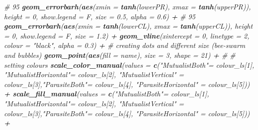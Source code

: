 \documentclass[
]{article}
\newenvironment{Shaded}{\begin{snugshade}}{\end{snugshade}}
\newcommand{\CommentTok}[1]{\textcolor[rgb]{0.56,0.35,0.01}{\textit{#1}}}
\newcommand{\DataTypeTok}[1]{\textcolor[rgb]{0.13,0.29,0.53}{#1}}
\newcommand{\DecValTok}[1]{\textcolor[rgb]{0.00,0.00,0.81}{#1}}
\newcommand{\FloatTok}[1]{\textcolor[rgb]{0.00,0.00,0.81}{#1}}
\newcommand{\KeywordTok}[1]{\textcolor[rgb]{0.13,0.29,0.53}{\textbf{#1}}}
\newcommand{\NormalTok}[1]{#1}
\newcommand{\OperatorTok}[1]{\textcolor[rgb]{0.81,0.36,0.00}{\textbf{#1}}}
\newcommand{\StringTok}[1]{\textcolor[rgb]{0.31,0.60,0.02}{#1}}
\begin{document}
\begin{Shaded}
\begin{Highlighting}[]
{{{\StringTok{  }\CommentTok{# 95 %
\StringTok{  }\KeywordTok{geom_errorbarh}\NormalTok{(}\KeywordTok{aes}\NormalTok{(}\DataTypeTok{xmin =} \KeywordTok{tanh}\NormalTok{(lowerPR), }\DataTypeTok{xmax =} \KeywordTok{tanh}\NormalTok{(upperPR)),  }\DataTypeTok{height =} \DecValTok{0}\NormalTok{, }\DataTypeTok{show.legend =}\NormalTok{ F, }\DataTypeTok{size =} \FloatTok{0.5}\NormalTok{, }\DataTypeTok{alpha =} \FloatTok{0.6}\NormalTok{) }\OperatorTok{+}
\StringTok{  }\CommentTok{# 95 %
\StringTok{  }\KeywordTok{geom_errorbarh}\NormalTok{(}\KeywordTok{aes}\NormalTok{(}\DataTypeTok{xmin =} \KeywordTok{tanh}\NormalTok{(lowerCL), }\DataTypeTok{xmax =} \KeywordTok{tanh}\NormalTok{(upperCL)),  }\DataTypeTok{height =} \DecValTok{0}\NormalTok{, }\DataTypeTok{show.legend =}\NormalTok{ F, }\DataTypeTok{size =} \FloatTok{1.2}\NormalTok{) }\OperatorTok{+}
\StringTok{  }\KeywordTok{geom_vline}\NormalTok{(}\DataTypeTok{xintercept =} \DecValTok{0}\NormalTok{, }\DataTypeTok{linetype =} \DecValTok{2}\NormalTok{, }\DataTypeTok{colour =} \StringTok{"black"}\NormalTok{, }\DataTypeTok{alpha =} \FloatTok{0.3}\NormalTok{) }\OperatorTok{+}
\StringTok{  }\CommentTok{# creating dots and different size (bee-swarm and bubbles)}
\StringTok{  }\KeywordTok{geom_point}\NormalTok{(}\KeywordTok{aes}\NormalTok{(}\DataTypeTok{fill =}\NormalTok{ name), }\DataTypeTok{size =} \DecValTok{3}\NormalTok{, }\DataTypeTok{shape =} \DecValTok{21}\NormalTok{) }\OperatorTok{+}\StringTok{ }\CommentTok{#}
\StringTok{  }\CommentTok{# setting colours}
\StringTok{  }\KeywordTok{scale_color_manual}\NormalTok{(}\DataTypeTok{values =}   \KeywordTok{c}\NormalTok{(}\StringTok{"MutualistBoth"}\NormalTok{=}\StringTok{ }\NormalTok{colour_ls[}\DecValTok{1}\NormalTok{], }\StringTok{"MutualistHorizontal"}\NormalTok{=}\StringTok{ }\NormalTok{colour_ls[}\DecValTok{2}\NormalTok{], }\StringTok{"MutualistVertical"}\NormalTok{ =}\StringTok{ }\NormalTok{colour_ls[}\DecValTok{3}\NormalTok{],}\StringTok{"ParasiteBoth"}\NormalTok{=}\StringTok{ }\NormalTok{colour_ls[}\DecValTok{4}\NormalTok{], }\StringTok{"ParasiteHorizontal"}\NormalTok{ =}\StringTok{ }\NormalTok{colour_ls[}\DecValTok{5}\NormalTok{])) }\OperatorTok{+}
\StringTok{  }\KeywordTok{scale_fill_manual}\NormalTok{(}\DataTypeTok{values =} \KeywordTok{c}\NormalTok{(}\StringTok{"MutualistBoth"}\NormalTok{=}\StringTok{ }\NormalTok{colour_ls[}\DecValTok{1}\NormalTok{], }\StringTok{"MutualistHorizontal"}\NormalTok{=}\StringTok{ }\NormalTok{colour_ls[}\DecValTok{2}\NormalTok{], }\StringTok{"MutualistVertical"}\NormalTok{ =}\StringTok{ }\NormalTok{colour_ls[}\DecValTok{3}\NormalTok{],}\StringTok{"ParasiteBoth"}\NormalTok{=}\StringTok{ }\NormalTok{colour_ls[}\DecValTok{4}\NormalTok{], }\StringTok{"ParasiteHorizontal"}\NormalTok{ =}\StringTok{ }\NormalTok{colour_ls[}\DecValTok{5}\NormalTok{])) }\OperatorTok{+}
}}}}}
\end{Highlighting}
\end{Shaded}
\end{document}
